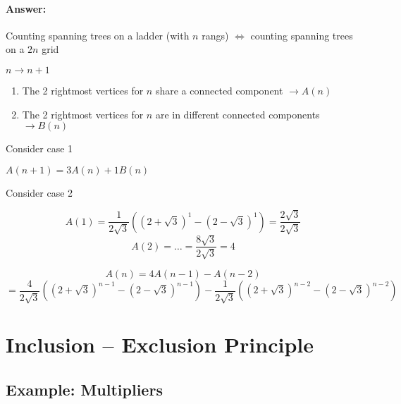 \documentclass[11pt]{article}
\begin{document}
\paragraph{Answer:}
Counting spanning trees on a ladder (with $ n $ rangs) $ \Leftrightarrow $ counting spanning trees on a $ 2n $ grid

$ n \rightarrow n + 1 $



\begin{enumerate}

\item
	The 2 rightmost vertices for $ n $ share a connected component $ \rightarrow A(n) $
	
\item
	The 2 rightmost vertices for $ n $ are in different connected components $ \rightarrow B(n) $

\end{enumerate}

Consider case 1

$ A(n + 1) = 3 A(n) + 1 B(n) $ \newline

Consider case 2




\[ A(1) = \frac{1}{2 \sqrt{3}} \left( ( 2 + \sqrt{3} )^1 - ( 2 - \sqrt{3} )^1 \right) = \frac{2 \sqrt{3}}{2 \sqrt{3}} \]
\[ A(2) = \dots = \frac{8 \sqrt{3}}{2 \sqrt{3}} = 4 \] \medskip

\[ A(n) = 4 A(n - 1) - A(n - 2) \]
\[ = \frac{4}{2 \sqrt{3}} \left( ( 2 + \sqrt{3} )^{n-1} - ( 2 - \sqrt{3} )^{n-1} \right) - \frac{1}{2 \sqrt{3}} \left( ( 2 + \sqrt{3} )^{n-2} - ( 2 - \sqrt{3} )^{n-2} \right) \]


\section{Inclusion – Exclusion Principle}

\subsection{Example: Multipliers}
\end{document}
